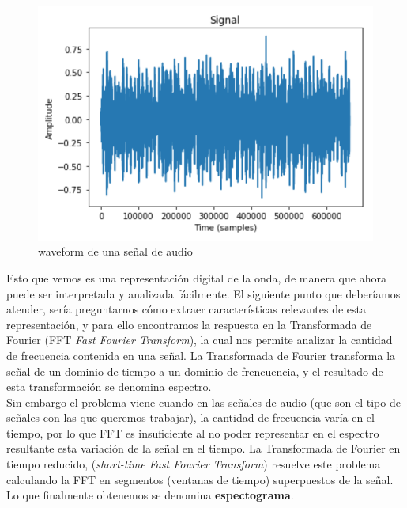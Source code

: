 \documentclass[11pt,a4paper,spanish]{book}
\begin{document}
	\begin{figure}[H]
		\includegraphics[scale=0.4]{waveform.png}
		\caption{waveform de una señal de audio}
	\end{figure}
	
	Esto que vemos es una representación digital de la onda, de manera que ahora puede ser interpretada y analizada fácilmente.\hfill \break
	El siguiente punto que deberíamos atender, sería preguntarnos cómo extraer características relevantes de esta representación, y para ello encontramos la respuesta en la Transformada de Fourier (FFT \emph{Fast Fourier Transform}), la cual nos permite analizar la cantidad de frecuencia contenida en una señal. La Transformada de Fourier transforma la señal de un dominio de tiempo a un dominio de frencuencia, y el resultado de esta transformación se denomina espectro. \\
	Sin embargo el problema viene cuando en las señales de audio (que son el tipo de señales con las que queremos trabajar), la cantidad de frecuencia varía en el tiempo, por lo que FFT es insuficiente al no poder representar en el espectro resultante esta variación de la señal en el tiempo. La Transformada de Fourier en tiempo reducido, (\emph{short-time Fast Fourier Transform}) resuelve este problema calculando la FFT en segmentos (ventanas de tiempo) superpuestos de la señal. Lo que finalmente obtenemos se denomina \textbf{espectograma}.
	
\end{document}
